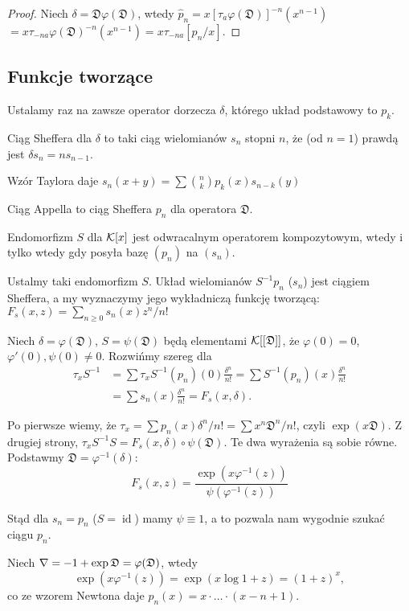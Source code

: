 \begin{proof}
	Niech $\delta = \mathfrak D \varphi(\mathfrak D)$, wtedy $\widehat{p}_n = x[\tau_a \varphi(\mathfrak D)]^{-n} (x^{n-1})$ $= x \tau_{-na} \varphi(\mathfrak D)^{-n} (x^{n-1}) = x \tau_{-na}[p_n/x]$.
\end{proof}

\subsection{Funkcje tworzące}
Ustalamy raz na zawsze operator dorzecza $\delta$, którego układ podstawowy to $p_k$.

\begin{definicja}
	Ciąg Sheffera dla $\delta$ to taki ciąg wielomianów $s_n$ stopni $n$, że (od $n = 1$) prawdą jest $\delta s_n = n s_{n-1}$.
\end{definicja}

Wzór Taylora daje $s_n(x+y) = \sum {n \choose k} p_k(x) s_{n-k}(y)$

\begin{definicja}
	Ciąg Appella to ciąg Sheffera $p_n$ dla operatora $\mathfrak D$.
\end{definicja}

\begin{fakt}
	Endomorfizm $S$ dla $\mathcal K[x]$ jest odwracalnym operatorem kompozytowym, wtedy i tylko wtedy gdy posyła bazę $(p_n)$ na $(s_n)$.
\end{fakt}

Ustalmy taki endomorfizm $S$.
Układ wielomianów $S^{-1}p_n$ ($s_n$) jest ciągiem Sheffera, a my wyznaczymy jego wykładniczą funkcję tworzącą: $F_s(x, z) = \sum_{n \ge 0} s_n(x) z^n/n!$

Niech $\delta = \varphi(\mathfrak D)$, $S = \psi(\mathfrak D)$ będą elementami $\mathcal K[[\mathfrak D]]$, że $\varphi(0) = 0$, $\varphi'(0), \psi(0) \neq 0$.
Rozwińmy szereg dla
\begin{align*}
	\tau_x S^{-1} & = \sum \tau_x S^{-1} (p_n)(0) \frac{\delta^n}{n!} = \sum S^{-1} (p_n)(x) \frac{\delta^n}{n!} \\
	& = \sum s_n(x) \frac{\delta^n}{n!} = F_s(x, \delta).
\end{align*}

Po pierwsze wiemy, że $\tau_x = \sum p_n(x) \delta^n / n! = \sum x^n \mathfrak D^n / n!$, czyli $\exp(x \mathfrak D)$.
Z drugiej strony, $\tau_x S^{-1}S = F_s(x, \delta) \circ \psi(\mathfrak D)$.
Te dwa wyrażenia są sobie równe.
Podstawmy $\mathfrak D = \varphi^{-1} (\delta)$:
\[
	F_s(x,z) = \frac{\exp (x \varphi^{-1}(z))}{\psi(\varphi^{-1}(z))}
\]

Stąd dla $s_n = p_n$ ($S = \operatorname{id}$) mamy $\psi \equiv 1$, a to pozwala nam wygodnie szukać ciągu $p_n$.

\begin{przyklad}
	Niech $\operatorname{\nabla} = -1 + \exp \mathfrak D = \varphi(\mathfrak D)$, wtedy
	\[
		\exp(x \varphi^{-1}(z)) = \exp(x \log 1+z) = (1+z)^x,
	\]
	co ze wzorem Newtona daje $p_n(x) = x \cdot \ldots \cdot (x - n +1)$.
\end{przyklad}